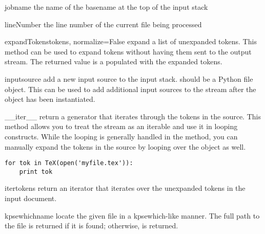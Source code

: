 \begin{memberdesc}[TeX]{jobname}
the name of the basename at the top of the input stack
\end{memberdesc}

\begin{memberdesc}[TeX]{lineNumber}
the line number of the current file being processed 
\end{memberdesc}


\begin{methoddesc}[TeX]{expandTokens}{tokens, normalize=False}
expand a list of unexpanded tokens.  This method can be used to expand
tokens without having them sent to the output stream.  The returned value
is a  populated with the expanded tokens.
\end{methoddesc}

\begin{methoddesc}[TeX]{input}{source}
add a new input source to the input stack.   should be
a Python file object.  This can be used to add additional input sources
to the stream after the  object has been instantiated.
\end{methoddesc}

\begin{methoddesc}[TeX]{__iter__}{}
return a generator that iterates through the tokens in the source.  
This method allows you to treat the  stream as an iterable
and use it in looping constructs.  While the looping is generally
handled in the  method, you can manually expand the
tokens in the source by looping over the  object as well.
\begin{verbatim}
for tok in TeX(open('myfile.tex')):
    print tok
\end{verbatim}
\end{methoddesc}

\begin{methoddesc}[TeX]{itertokens}{}
return an iterator that iterates over the unexpanded tokens in the 
input document.
\end{methoddesc}

\begin{methoddesc}[TeX]{kpsewhich}{name}
locate the given file in a kpsewhich-like manner.  The full path to the
file is returned if it is found; otherwise,  is returned.
\end{methoddesc}

